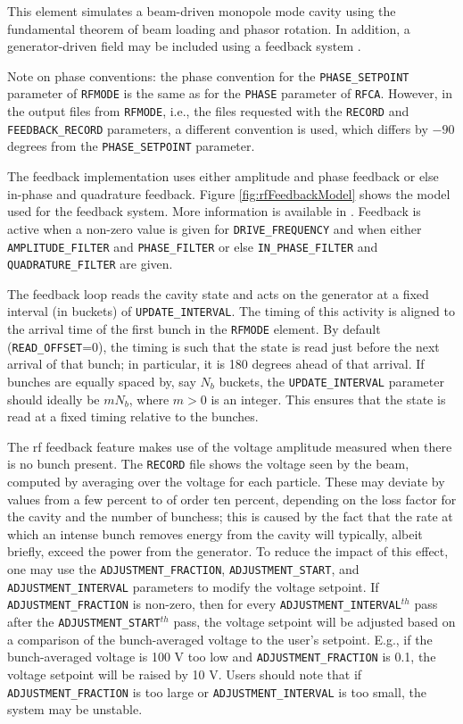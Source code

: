 This element simulates a beam-driven monopole mode cavity using the fundamental theorem of beam loading and phasor rotation.
In addition, a generator-driven field may be included using a feedback system \cite{Berenc-IPAC15-MOPMA006}.

Note on phase conventions: the phase convention for the \verb|PHASE_SETPOINT|  parameter of \verb|RFMODE| is the
same as for the \verb|PHASE| parameter of \verb|RFCA|. However, in the output files from \verb|RFMODE|, i.e., the
files requested with the \verb|RECORD| and \verb|FEEDBACK_RECORD| parameters, a different convention is used, which 
differs by $-90$ degrees from the \verb|PHASE_SETPOINT|  parameter. 

The feedback implementation uses either amplitude and phase feedback or else in-phase and quadrature feedback.
Figure \ref{fig:rfFeedbackModel} shows the model used for the feedback system.
More information is available in \cite{Berenc-IPAC15-MOPMA006}.
Feedback is active when a non-zero value is given for \verb|DRIVE_FREQUENCY| and when either
\verb|AMPLITUDE_FILTER| and \verb|PHASE_FILTER| or else
\verb|IN_PHASE_FILTER| and \verb|QUADRATURE_FILTER| are given.

The feedback loop reads the cavity state and acts on the generator at a fixed interval (in buckets) of
\verb|UPDATE_INTERVAL|. 
The timing of this activity is aligned to the arrival time of the first bunch in the \verb|RFMODE| element.
By default (\verb|READ_OFFSET|=0), the timing is such that the state is read just before the next arrival of
that bunch; in particular, it is 180 degrees ahead of that arrival.
If bunches are equally spaced by, say $N_b$ buckets, the \verb|UPDATE_INTERVAL| parameter should ideally be
$m N_b$, where $m>0$ is an integer.
This ensures that the state is read at a fixed timing relative to the bunches.

The rf feedback feature makes use of the voltage amplitude measured when there is no bunch present.
The \verb|RECORD| file shows the voltage seen by the beam, computed by averaging over the voltage for
each particle.
These may deviate by values from a few percent to of order ten percent, depending on the loss factor for the
cavity and the number of bunchess; this is caused by the fact that the rate at which an intense bunch removes
energy from the cavity will typically, albeit briefly, exceed the power from the generator.
To reduce the impact of this effect, one may use the \verb|ADJUSTMENT_FRACTION|, \verb|ADJUSTMENT_START|, and \verb|ADJUSTMENT_INTERVAL|
parameters to modify the voltage setpoint.
If \verb|ADJUSTMENT_FRACTION| is non-zero, then for every \verb|ADJUSTMENT_INTERVAL|$^{th}$ pass after the 
\verb|ADJUSTMENT_START|$^{th}$ pass, the voltage setpoint will be adjusted based on a comparison of the bunch-averaged
voltage to the user's setpoint.
E.g., if the bunch-averaged voltage is 100 V too low and \verb|ADJUSTMENT_FRACTION| is 0.1, the voltage setpoint will
be raised by 10 V.
Users should note that if \verb|ADJUSTMENT_FRACTION| is too large or \verb|ADJUSTMENT_INTERVAL| is too small, the system
may be unstable.

